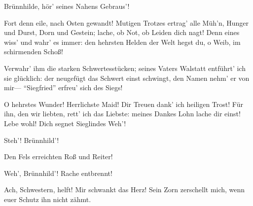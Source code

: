 \begin{drama}
Brünnhilde, hör' seines Nahens Gebraus'!
 

\Brunnhildespeaks


Fort denn eile, nach Osten gewandt!
Mutigen Trotzes ertrag' alle Müh'n,
Hunger und Durst, Dorn und Gestein;
lache, ob Not, ob Leiden dich nagt!
Denn eines wiss' und wahr' es immer:
den hehrsten Helden der Welt
hegst du, o Weib, im schirmenden Schoß!
 



Verwahr' ihm die starken Schwertesstücken;
seines Vaters Walstatt entführt' ich sie glücklich:
der neugefügt das Schwert einst schwingt,
den Namen nehm' er von mir---
``Siegfried'' erfreu' sich des Siegs!
 

\Sieglindespeaks


O hehrstes Wunder! Herrlichste Maid!
Dir Treuen dank' ich heiligen Trost!
Für ihn, den wir liebten, rett' ich das Liebste:
meines Dankes Lohn lache dir einst!
Lebe wohl! Dich segnet Sieglindes Weh'!
 




Steh'! Brünnhild'!
 






Den Fels erreichten Roß und Reiter!
 

Weh', Brünnhild'! Rache entbrennt!
 

\Brunnhildespeaks
Ach, Schwestern, helft! Mir schwankt das Herz!
Sein Zorn zerschellt mich,
wenn euer Schutz ihn nicht zähmt.
 




\end{drama}
